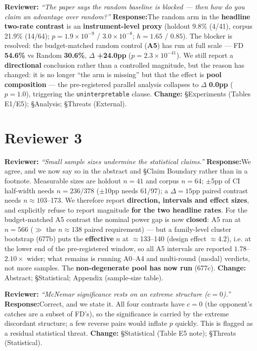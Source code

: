 \documentclass[11pt]{article}
\newcommand{\rev}[1]{\textbf{\color{blue}Reviewer:} \emph{``#1''}}
\newcommand{\resp}{\textbf{\color{red}Response:}}
\newcommand{\chg}[1]{\textbf{Change:} #1}
\begin{document}
\rev{The paper says the random baseline is blocked --- then how do you claim an advantage over random?}
\resp The random arm in the \textbf{headline two-rate contrast} is an \textbf{instrument-level
proxy} (holdout 9.8\% (4/41), corpus 21.9\% (14/64); $p{=}1.9\times10^{-9}$ / $3.0\times10^{-8}$;
$h{=}1.65$ / $0.85$). The blocker is resolved: the budget-matched random control (\textbf{A5}) has
run at full scale --- FD \textbf{54.6\%} vs Random \textbf{30.6\%}, $\Delta$ \textbf{+24.0pp}
($p{=}2.3\times10^{-41}$). We still report a \textbf{directional} conclusion rather than a
controlled magnitude, but the reason has changed: it is no longer ``the arm is missing'' but that
the effect is \textbf{pool composition} --- the pre-registered parallel analysis collapses to
$\Delta$ \textbf{0.0pp} ($p{=}1.0$), triggering the \texttt{uninterpretable} clause.
\chg{\S Experiments (Tables E1/E5); \S Analysis; \S Threats (External).}

\section*{Reviewer 3}

\rev{Small sample sizes undermine the statistical claims.}
\resp We agree, and we now say so in the abstract and \S Claim Boundary rather than in a footnote.
Measurable sizes are holdout $n{=}41$ and corpus $n{=}64$; $\pm$5pp of CI half-width needs
$n{=}236/378$ ($\pm$10pp needs 61/97); a $\Delta{=}15$pp paired contrast needs $n\approx103$--173.
We therefore report \textbf{direction, intervals and effect sizes}, and explicitly refuse to report
magnitude \textbf{for the two headline rates}. For the budget-matched A5 contrast the nominal power
gap is now \textbf{closed}: A5 ran at $n{=}566$ ($\gg$ the $n\approx138$ paired requirement) --- but
a family-level cluster bootstrap (677b) puts the \textbf{effective} $n$ at $\approx$133--140
(design effect $\approx$4.2), i.e. at the lower end of the pre-registered window, so all A5
intervals are reported $1.78$--$2.10\times$ wider; what remains is running A0--A4 and multi-round
(modal) verdicts, not more samples. The \textbf{non-degenerate pool has now run} (677c).
\chg{Abstract; \S Statistical; Appendix (sample-size table).}

\rev{McNemar significance rests on an extreme structure ($c{=}0$).}
\resp Correct, and we state it. All four contrasts have $c{=}0$ (the opponent's catches are a subset
of FD's), so the significance is carried by the extreme discordant structure; a few reverse pairs
would inflate $p$ quickly. This is flagged as a residual statistical threat.
\chg{\S Statistical (Table E5 note); \S Threats (Statistical).}
\end{document}
